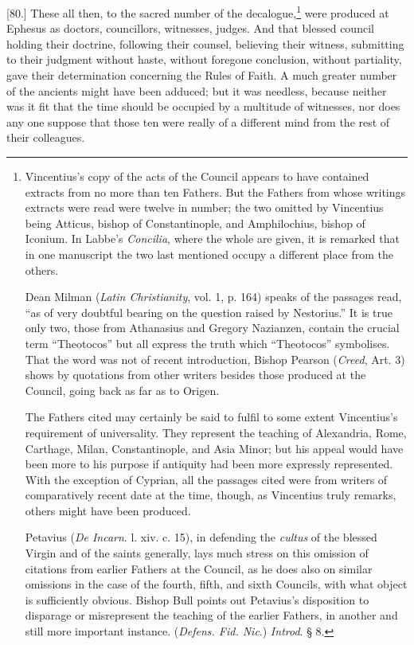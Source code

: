 [80.] These all then, to the sacred number of the decalogue,\footnote{Vincentius’s copy of the acts of the Council appears to have contained extracts from no more than ten Fathers. But the Fathers from whose writings extracts were read were twelve in number; the two omitted by Vincentius being Atticus, bishop of Constantinople, and Amphilochius, bishop of Iconium. In Labbe’s \emph{Concilia}, where the whole are given, it is remarked that in one manuscript the two last mentioned occupy a different place from the others. \par Dean Milman (\emph{Latin Christianity}, vol. 1, p. 164) speaks of the passages read, “as of very doubtful bearing on the question raised by Nestorius.” It is true only two, those from Athanasius and Gregory Nazianzen, contain the crucial term “Theotocos” but all express the truth which “Theotocos” symbolises. That the word was not of recent introduction, Bishop Pearson (\emph{Creed}, Art. 3) shows by quotations from other writers besides those produced at the Council, going back as far as to Origen. \par The Fathers cited may certainly be said to fulfil to some extent Vincentius’s requirement of universality. They represent the teaching of Alexandria, Rome, Carthage, Milan, Constantinople, and Asia Minor; but his appeal would have been more to his purpose if antiquity had been more expressly represented. With the exception of Cyprian, all the passages cited were from writers of comparatively recent date at the time, though, as Vincentius truly remarks, others might have been produced. \par Petavius (\emph{De Incarn}. l. xiv. c. 15), in defending the \emph{cultus} of the blessed Virgin and of the saints generally, lays much stress on this omission of citations from earlier Fathers at the Council, as he does also on similar omissions in the case of the fourth, fifth, and sixth Councils, with what object is sufficiently obvious. Bishop Bull points out Petavius’s disposition to disparage or misrepresent the teaching of the earlier Fathers, in another and still more important instance. (\emph{Defens. Fid. Nic}.) \emph{Introd}. § 8.} were produced at Ephesus as doctors, councillors, witnesses, judges. And that blessed council holding their doctrine, following their counsel, believing their witness, submitting to their judgment without haste, without foregone conclusion, without partiality, gave their determination concerning the Rules of Faith. A much greater number of the ancients might have been adduced; but it was needless, because neither was it fit that the time should be occupied by a multitude of witnesses, nor does any one suppose that those ten were really of a different mind from the rest of their colleagues.

